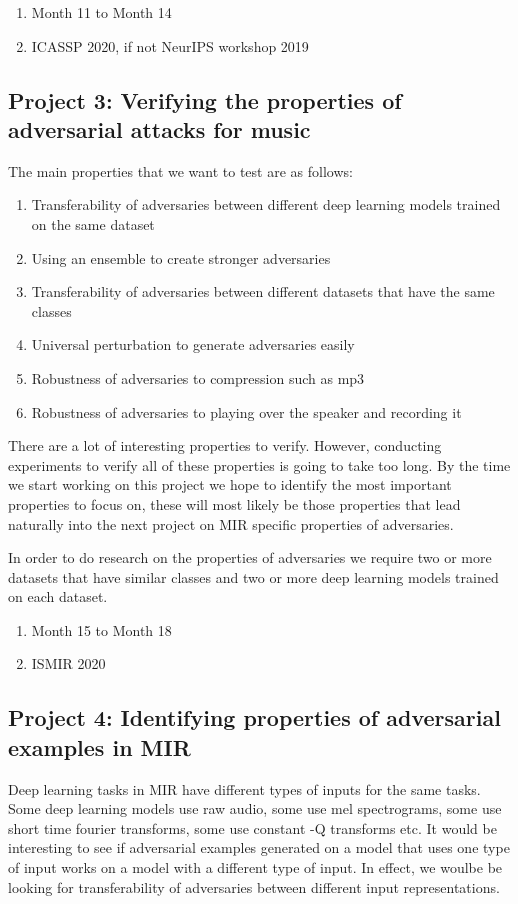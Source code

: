 \documentclass[journal,onecolumn]{IEEEtran}
\begin{document}
\begin{enumerate}
\item Month 11 to Month 14
\item ICASSP 2020, if not NeurIPS workshop 2019
\end{enumerate}

\subsection{Project 3: Verifying the properties of adversarial attacks for music}
The main properties that we want to test are as follows:
\begin{enumerate}
\item Transferability of adversaries between different deep learning models trained on the same dataset
\item Using an ensemble to create stronger adversaries
\item Transferability of adversaries between different datasets that have the same classes
\item Universal perturbation to generate adversaries easily
\item Robustness of adversaries to compression such as mp3
\item Robustness of adversaries to playing over the speaker and recording it
\end{enumerate}

There are a lot of interesting properties to verify. However, conducting experiments to verify all of these properties is going to take too long. By the time we start working on this project we hope to identify the most important properties to focus on, these will most likely be those properties that lead naturally into the next project on MIR specific properties of adversaries.

In order to do research on the properties of adversaries we require two or more datasets that have similar classes and two or more deep learning models trained on each dataset. 
\begin{enumerate}
\item Month 15 to Month 18
\item ISMIR 2020
\end{enumerate}
\subsection{Project 4: Identifying properties of adversarial examples in MIR}
Deep learning tasks in MIR have different types of inputs for the same tasks. Some deep learning models use raw audio, some use mel spectrograms, some use short time fourier transforms, some use constant -Q transforms etc. It would be interesting to see if adversarial examples generated on a model that uses one type of input works on a model with a different type of input. In effect, we woulbe be looking for transferability of adversaries between different input representations.
\end{document}
